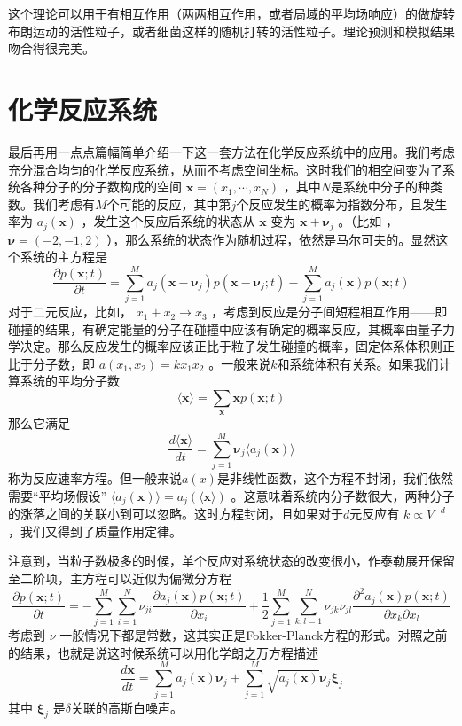 \documentclass{ctexart}
\begin{document}
这个理论可以用于有相互作用（两两相互作用，或者局域的平均场响应）的做旋转布朗运动的活性粒子，或者细菌这样的随机打转的活性粒子。理论预测和模拟结果吻合得很完美。

\section{化学反应系统}

最后再用一点点篇幅简单介绍一下这一套方法在化学反应系统中的应用。我们考虑充分混合均匀的化学反应系统，从而不考虑空间坐标。这时我们的相空间变为了系统各种分子的分子数构成的空间  $\bm{x}=(x_1,\cdots,x_N)$ ，其中$N$是系统中分子的种类数。我们考虑有$M$个可能的反应，其中第$j$个反应发生的概率为指数分布，且发生率为 $a_j(\bm{x})$ ，发生这个反应后系统的状态从 $\bm{x}$ 变为 $\bm{x}+\bm{\nu}_j$ 。（比如  ， $\bm{\nu}=(-2,-1,2)$ ），那么系统的状态作为随机过程，依然是马尔可夫的。显然这个系统的主方程是
\begin{equation}
\frac{\partial p(\bm{x};t)}{\partial t}=\sum_{j=1}^{M}a_j(\bm{x}-\bm{\nu}_j)p(\bm{x}-\bm{\nu}_j;t)-\sum_{j=1}^{M}a_j(\bm{x})p(\bm{x};t)
\end{equation}
对于二元反应，比如， $x_1+x_2\to x_3$ ，考虑到反应是分子间短程相互作用——即碰撞的结果，有确定能量的分子在碰撞中应该有确定的概率反应，其概率由量子力学决定。那么反应发生的概率应该正比于粒子发生碰撞的概率，固定体系体积则正比于分子数，即 $a(x_1,x_2)=kx_1x_2$ 。一般来说$k$和系统体积有关系。如果我们计算系统的平均分子数
\begin{equation}
\langle\bm{x}\rangle=\sum_{\bm{x}} \bm{x}p(\bm{x};t)
\end{equation}
那么它满足
\begin{equation}
\frac{d\langle\bm{x}\rangle}{dt}=\sum_{j=1}^M \bm{\nu}_j\langle a_j(\bm{x})\rangle
\end{equation}
称为反应速率方程。但一般来说$a(x)$是非线性函数，这个方程不封闭，我们依然需要“平均场假设” $\langle a_j(\bm{x})\rangle=a_j(\langle \bm{x}\rangle)$ 。这意味着系统内分子数很大，两种分子的涨落之间的关联小到可以忽略。这时方程封闭，且如果对于$d$元反应有 $k\propto V^{-d}$ ，我们又得到了质量作用定律。

注意到，当粒子数极多的时候，单个反应对系统状态的改变很小，作泰勒展开保留至二阶项，主方程可以近似为偏微分方程
\begin{equation}
\frac{\partial p(\bm{x};t)}{\partial t}=-\sum_{j=1}^{M}\sum_{i=1}^N\nu_{ji}\frac{\partial a_j(\bm{x})p(\bm{x};t)}{\partial x_i}+\frac{1}{2}\sum_{j=1}^{M} \sum_{k,l=1}^N\nu_{jk}\nu_{jl} \frac{\partial^2 a_j(\bm{x})p(\bm{x};t)}{\partial x_k\partial x_l}
\end{equation}
考虑到 $\nu$ 一般情况下都是常数，这其实正是Fokker-Planck方程的形式。对照之前的结果，也就是说这时候系统可以用化学朗之万方程描述
\begin{equation}
\frac{d\bm{x}}{dt}=\sum_{j=1}^M a_j(\bm{x})\bm{\nu}_j+\sum_{j=1}^{M}\sqrt{a_j(\bm{x})}\bm{\nu}_j\bm{\xi}_j
\end{equation}
其中 $\bm{\xi}_j$ 是$\delta$关联的高斯白噪声。
\end{document}
